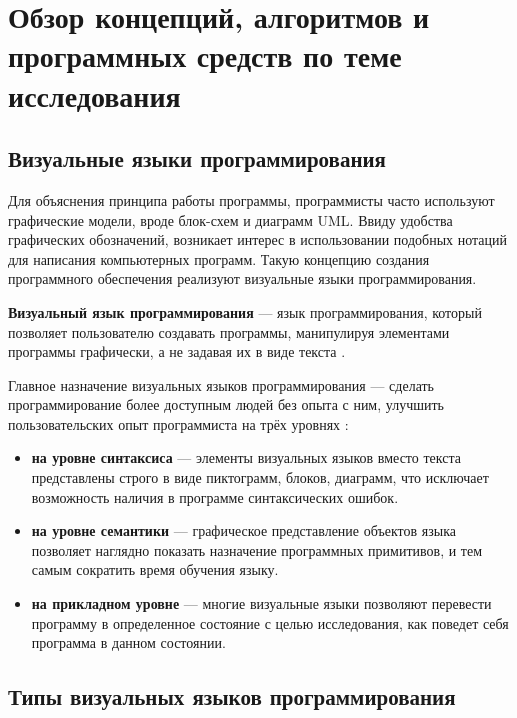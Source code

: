 \chapter{Обзор концепций, алгоритмов и программных средств по теме исследования}\label{ch:ch1}

\section{Визуальные языки программирования}\label{sec:ch1/sec1}

Для объяснения принципа работы программы, программисты часто используют
графические модели, вроде блок-схем и диаграмм UML. Ввиду удобства графических
обозначений, возникает интерес в использовании подобных нотаций для
написания компьютерных программ. Такую концепцию создания программного обеспечения
реализуют визуальные языки программирования.

\textbf{Визуальный язык программирования} --- язык программирования, 
который позволяет пользователю создавать программы, манипулируя элементами
программы графически, а не задавая их в виде текста \cite{maturityofvpl}.

Главное назначение визуальных языков программирования --- сделать 
программирование более доступным людей без опыта с ним,
улучшить пользовательских опыт программиста на трёх уровнях \cite{agentsheetsmovingbeyondsyntax}:

\begin{itemize}
    \item \textbf{на уровне синтаксиса} --- элементы визуальных языков вместо текста 
    представлены строго в виде пиктограмм, блоков, диаграмм, что исключает возможность
    наличия в программе синтаксических ошибок.
    \item \textbf{на уровне семантики} --- графическое представление объектов
    языка позволяет наглядно показать назначение программных примитивов, и тем
    самым сократить время обучения языку.
    \item \textbf{на прикладном уровне} --- многие визуальные языки позволяют
    перевести программу в определенное состояние с целью исследования, как поведет
    себя программа в данном состоянии.
\end{itemize}

\section{Типы визуальных языков программирования}\label{sec:ch1/sec2}


